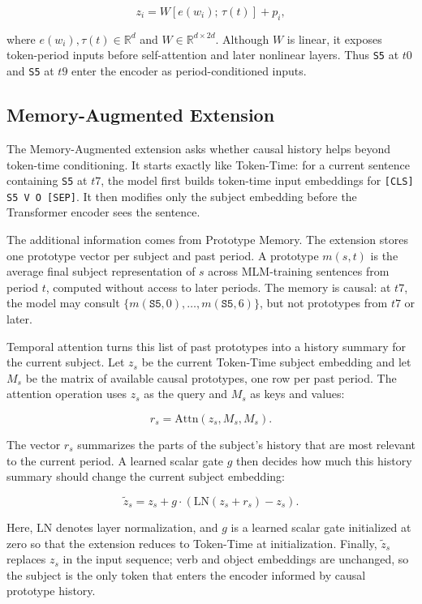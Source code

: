 \documentclass[runningheads]{llncs}
\begin{document}
\[
  z_i = W [e(w_i);\, \tau(t)] + p_i ,
\]

where \(e(w_i), \tau(t) \in \mathbb{R}^d\) and \(W \in \mathbb{R}^{d \times
2d}\). Although \(W\) is linear, it exposes token-period inputs before
self-attention and later nonlinear layers. Thus \texttt{S5} at \(t0\) and
\texttt{S5} at \(t9\) enter the encoder as period-conditioned inputs.

\subsection{Memory-Augmented Extension}
The Memory-Augmented extension asks whether causal history helps beyond token-time
conditioning. It starts exactly like Token-Time: for a current sentence containing
\texttt{S5} at \(t7\), the model first builds token-time input embeddings for
\texttt{[CLS] S5 V O [SEP]}. It then modifies only the subject embedding before
the Transformer encoder sees the sentence.

The additional information comes from Prototype Memory. The extension stores one
prototype vector per subject and past period. A prototype \(m(s,t)\) is the
average final subject representation of \(s\) across MLM-training sentences from period
\(t\), computed without access to later periods. The memory is causal: at \(t7\), the model may consult
\(\{m(\texttt{S5},0),\ldots,m(\texttt{S5},6)\}\), but not prototypes from
\(t7\) or later.

Temporal attention turns this list of past prototypes into a history summary
for the current subject. Let \(z_s\) be the current Token-Time subject embedding and
let \(M_s\) be the matrix of available causal prototypes, one row per past
period. The attention operation uses \(z_s\) as the query and \(M_s\) as keys
and values:

\[
  r_s = \mathrm{Attn}(z_s, M_s, M_s).
\]

The vector \(r_s\) summarizes the parts of the subject's history that are most
relevant to the current period. A learned scalar gate \(g\) then decides how
much this history summary should change the current subject embedding:

\[
  \tilde{z}_s =
  z_s + g \cdot
  \left(\mathrm{LN}(z_s + r_s) - z_s\right).
\]

Here, \(\mathrm{LN}\) denotes layer normalization, and \(g\) is a learned
scalar gate initialized at zero so that the extension reduces to Token-Time at
initialization. Finally, \(\tilde{z}_s\) replaces \(z_s\) in the input
sequence; verb and object embeddings are unchanged, so the subject is the only
token that enters the encoder informed by causal prototype history.
\end{document}
